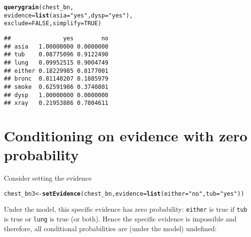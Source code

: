 \documentclass[10pt]{article}\usepackage[]{graphicx}\usepackage[]{xcolor}
\makeatletter
\newcommand{\hlnum}[1]{\textcolor[rgb]{0.686,0.059,0.569}{#1}}%
\newcommand{\hlstr}[1]{\textcolor[rgb]{0.192,0.494,0.8}{#1}}%
\newcommand{\hlstd}[1]{\textcolor[rgb]{0.345,0.345,0.345}{#1}}%
\newcommand{\hlkwb}[1]{\textcolor[rgb]{0.69,0.353,0.396}{#1}}%
\newcommand{\hlkwc}[1]{\textcolor[rgb]{0.333,0.667,0.333}{#1}}%
\newcommand{\hlkwd}[1]{\textcolor[rgb]{0.737,0.353,0.396}{\textbf{#1}}}%
\newenvironment{kframe}{%
 \def\at@end@of@kframe{}%
 \ifinner\ifhmode%
  \def\at@end@of@kframe{\end{minipage}}%
  \begin{minipage}{\columnwidth}%
 \fi\fi%
 \def\FrameCommand##1{\hskip\@totalleftmargin \hskip-\fboxsep
 \colorbox{shadecolor}{##1}\hskip-\fboxsep
     \hskip-\linewidth \hskip-\@totalleftmargin \hskip\columnwidth}%
 \MakeFramed {\advance\hsize-\width
   \@totalleftmargin\z@ \linewidth\hsize
   \@setminipage}}%
 {\par\unskip\endMakeFramed%
 \at@end@of@kframe}
\newenvironment{knitrout}{}{} %
\makeatother
\begin{document}
\begin{enumerate}
\begin{knitrout}
\color{fgcolor}\begin{kframe}
\begin{alltt}
\hlkwd{querygrain}\hlstd{(chest_bn,}
           \hlkwc{evidence}\hlstd{=}\hlkwd{list}\hlstd{(}\hlkwc{asia}\hlstd{=}\hlstr{"yes"}\hlstd{,} \hlkwc{dysp}\hlstd{=}\hlstr{"yes"}\hlstd{),}
           \hlkwc{exclude} \hlstd{=} \hlnum{FALSE}\hlstd{,} \hlkwc{simplify} \hlstd{=} \hlnum{TRUE}\hlstd{)}
\end{alltt}
\begin{verbatim}
##               yes        no
## asia   1.00000000 0.0000000
## tub    0.08775096 0.9122490
## lung   0.09952515 0.9004749
## either 0.18229985 0.8177001
## bronc  0.81140207 0.1885979
## smoke  0.62591986 0.3740801
## dysp   1.00000000 0.0000000
## xray   0.21953886 0.7804611
\end{verbatim}
\end{kframe}
\end{knitrout}


\end{enumerate}



\section{Conditioning on evidence with zero probability}
\label{sec:zero-probabilities}

Consider setting the evidence
\begin{knitrout}
\color{fgcolor}\begin{kframe}
\begin{alltt}
\hlstd{chest_bn3} \hlkwb{<-} \hlkwd{setEvidence}\hlstd{(chest_bn,} \hlkwc{evidence}\hlstd{=}\hlkwd{list}\hlstd{(}\hlkwc{either}\hlstd{=}\hlstr{"no"}\hlstd{,} \hlkwc{tub}\hlstd{=}\hlstr{"yes"}\hlstd{))}
\end{alltt}
\end{kframe}
\end{knitrout}

Under the model, this specific evidence has zero probability:
\verb|either| is true if \verb|tub| is true or \verb|lung| is true (or
both). Hence the specific evidence is impossible and therefore, all
conditional probabilities are (under the model) undefined:
\end{document}
